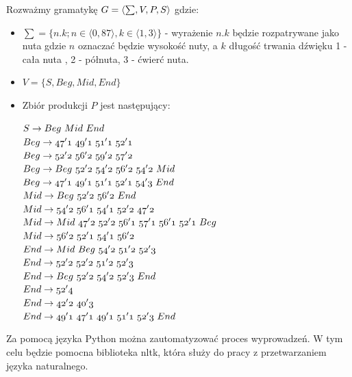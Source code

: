 \begin{przyklad}
	Rozważmy gramatykę $\mathnormal{G = \langle \sum, V, P, S \rangle}$ gdzie:
	\begin{itemize}
		\item $ \sum = \{ n.k; n \in \langle 0, 87 \rangle, k \in \langle 1, 3 \rangle \} $ - wyrażenie $n.k$ będzie rozpatrywane jako nuta gdzie $n$ oznaczać będzie wysokość nuty, a $k$ długość trwania  dźwięku 1 - cała nuta , 2 - półnuta, 3 - ćwierć nuta. 
		\item $V = \{ S, Beg, Mid, End\}$
		\item Zbiór produkcji $P$ jest następujący: 
		
		$\mathnormal{S \rightarrow Beg\ Mid\ End\ }$\\
		$\mathnormal{Beg \rightarrow 47'1\ 49'1\ 51'1\ 52'1\ }$\\
		$\mathnormal{Beg \rightarrow 52'2\ 56'2\ 59'2\ 57'2\ }$\\
		$\mathnormal{Beg \rightarrow Beg\ 52'2\ 54'2\ 56'2\ 54'2\ Mid\ }$\\
		$\mathnormal{Beg \rightarrow 47'1\ 49'1\ 51'1\ 52'1\ 54'3\ End\ }$\\
		$\mathnormal{Mid \rightarrow Beg\ 52'2\ 56'2\ End\ }$\\
		$\mathnormal{Mid \rightarrow 54'2\ 56'1\ 54'1\ 52'2\ 47'2\ }$\\
		$\mathnormal{Mid \rightarrow Mid\ 47'2\ 52'2\ 56'1\ 57'1\ 56'1\ 52'1\ Beg\ }$\\
		$\mathnormal{Mid \rightarrow 56'2\ 52'1\ 54'1\ 56'2\ }$\\
		$\mathnormal{End \rightarrow Mid\ Beg\ 54'2\ 51'2\ 52'3\  }$\\
		$\mathnormal{End \rightarrow 52'2\ 52'2\ 51'2\ 52'3\ }$\\
		$\mathnormal{End \rightarrow Beg\ 52'2\ 54'2\ 52'3\ End\ }$\\
		$\mathnormal{End \rightarrow 52'4\ }$\\
		$\mathnormal{End \rightarrow 42'2\ 40'3\ }$\\
		$\mathnormal{End \rightarrow 49'1\ 47'1\ 49'1\ 51'1\ 52'3\ End\ }$\\
	\end{itemize}
\end{przyklad}

Za pomocą języka Python można zautomatyzować proces wyprowadzeń. W tym celu będzie pomocna biblioteka nltk, która służy  do pracy z przetwarzaniem języka naturalnego. 

